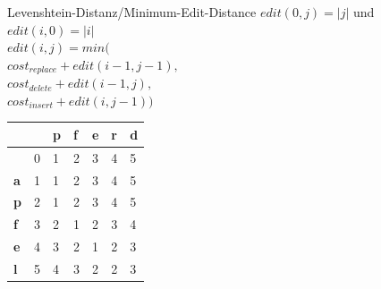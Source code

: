 \documentclass[aspectratio=169]{beamer}
\begin{document}
\begin{frame}[fragile]{Levenshtein-Distanz/Minimum-Edit-Distance}
$edit(0,j)=|j|$ und $edit(i,0)=|i|$\\
$edit(i,j)=min($\\
$cost_{replace} + edit(i-1,j-1),  $\\
$cost_{delete}+ edit(i-1,j),$\\
$cost_{insert}+ edit(i,j-1))  $\\
\begin{table}[]
\begin{tabular}{|l|l|l|l|l|l|l|}
\hline
           & \textbf{} & \textbf{p} & \textbf{f} & \textbf{e} & \textbf{r} & \textbf{d} \\ \hline
\textbf{}  & 0         & 1          & 2          & 3          & 4          & 5          \\ \hline
\textbf{a} & 1         & 1          & 2          & 3          & 4          & 5          \\ \hline
\textbf{p} & 2         & 1          & 2          & 3          & 4          & 5          \\ \hline
\textbf{f} & 3         & 2          & 1          & 2          & 3          & 4          \\ \hline
\textbf{e} & 4         & 3          & 2          & 1          & 2          & 3          \\ \hline
\textbf{l} & 5         & 4          & 3          & 2          & 2          & 3          \\ \hline
\end{tabular}
\end{table}
\end{frame}

\end{document}
